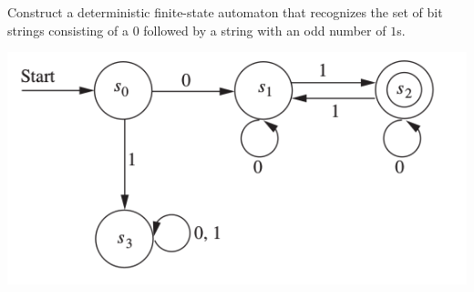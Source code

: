 \documentclass[../main.tex]{subfiles}
\begin{document}
Construct a deterministic finite-state automaton that recognizes the set of bit strings consisting of a $0$ followed by a string with an odd number of $1$s.

\solution
\includegraphics[width=\textwidth]{img/A13_3_35}
\end{document}

